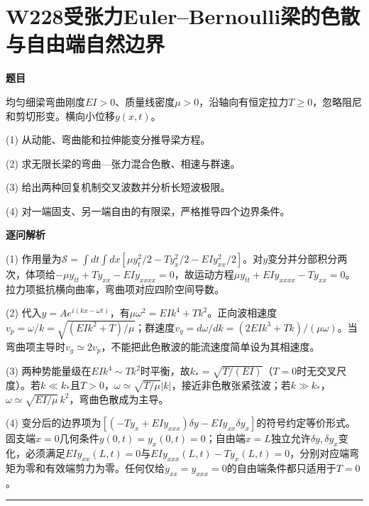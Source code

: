 \documentclass[UTF8,a4paper,11pt,oneside,openany]{ctexbook}
\begin{document}
\section*{W228\quad 受张力Euler–Bernoulli梁的色散与自由端自然边界}
\textbf{题目}\par
均匀细梁弯曲刚度$EI>0$、质量线密度$\mu>0$，沿轴向有恒定拉力$T\ge0$，忽略阻尼和剪切形变。横向小位移$y(x,t)$。
\par\smallskip\noindent (1) 从动能、弯曲能和拉伸能变分推导梁方程。
\par\smallskip\noindent (2) 求无限长梁的弯曲—张力混合色散、相速与群速。
\par\smallskip\noindent (3) 给出两种回复机制交叉波数并分析长短波极限。
\par\smallskip\noindent (4) 对一端固支、另一端自由的有限梁，严格推导四个边界条件。
\par\medskip\textbf{逐问解析}\par
\par\smallskip\noindent (1) 作用量为$\mathcal S=\int dt\int dx[\mu y_t^2/2-Ty_x^2/2-EIy_{xx}^2/2]$。对$y$变分并分部积分两次，体项给$-\mu y_{tt}+Ty_{xx}-EIy_{xxxx}=0$，故运动方程$\mu y_{tt}+EIy_{xxxx}-Ty_{xx}=0$。拉力项抵抗横向曲率，弯曲项对应四阶空间导数。
\par\smallskip\noindent (2) 代入$y=Ae^{i(kx-\omega t)}$，有$\mu\omega^2=EIk^4+Tk^2$。正向波相速度$v_p=\omega/k=\sqrt{(EI k^2+T)/\mu}$；群速度$v_g=d\omega/dk=(2EIk^3+Tk)/(\mu\omega)$。当弯曲项主导时$v_g\simeq2v_p$，不能把此色散波的能流速度简单设为其相速度。
\par\smallskip\noindent (3) 两种势能量级在$EIk^4\sim Tk^2$时平衡，故$k_*=\sqrt{T/(EI)}$（$T=0$时无交叉尺度）。若$k\ll k_*$且$T>0$，$\omega\simeq\sqrt{T/\mu}|k|$，接近非色散张紧弦波；若$k\gg k_*$，$\omega\simeq\sqrt{EI/\mu}\,k^2$，弯曲色散成为主导。
\par\smallskip\noindent (4) 变分后的边界项为$[(-Ty_x+EI y_{xxx})\delta y-EIy_{xx}\delta y_x]$的符号约定等价形式。固支端$x=0$几何条件$y(0,t)=y_x(0,t)=0$；自由端$x=L$独立允许$\delta y,\delta y_x$变化，必须满足$EIy_{xx}(L,t)=0$与$EIy_{xxx}(L,t)-Ty_x(L,t)=0$，分别对应端弯矩为零和有效端剪力为零。任何仅给$y_{xx}=y_{xxx}=0$的自由端条件都只适用于$T=0$。
\par\medskip\hrule\medskip
\end{document}
